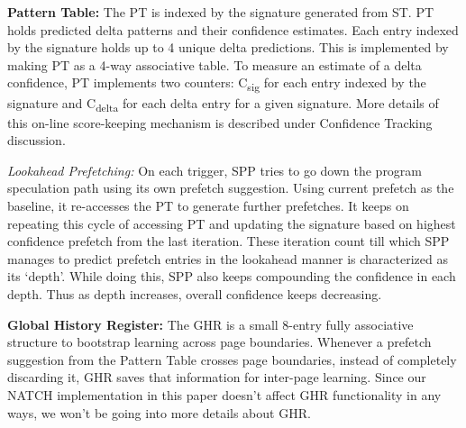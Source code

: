 \textbf{Pattern Table:} The PT is indexed by the signature generated
from ST.  PT holds predicted delta patterns and their confidence
estimates.  Each entry indexed by the signature holds up to 4 unique
delta predictions.  This is implemented by making PT as a 4-way
associative table.  To measure an estimate of a delta confidence, PT
implements two counters: C\textsubscript{sig} for each entry indexed
by the signature and C\textsubscript{delta} for each delta entry for a
given signature.  More details of this on-line score-keeping mechanism
is described under Confidence Tracking discussion.

\textit{Lookahead Prefetching:} On each trigger, SPP tries to go down
the program speculation path using its own prefetch suggestion.
Using current prefetch as the baseline, it re-accesses the PT to generate further
prefetches.  It keeps on repeating this cycle of accessing PT and
updating the signature based on highest confidence prefetch from the
last iteration.  These iteration count till which SPP manages to
predict prefetch entries in the lookahead manner is characterized as
its `depth'.  While doing this, SPP also keeps compounding the
confidence in each depth.  Thus as depth increases, overall confidence
keeps decreasing.  

\textbf{Global History Register:} The GHR is a small 8-entry fully
associative structure to bootstrap learning across page boundaries. 
Whenever a prefetch suggestion from the
Pattern Table crosses page boundaries, instead of completely
discarding it, GHR saves that information for inter-page learning.
Since our NATCH implementation in this paper doesn't affect GHR
functionality in any ways, we won't be going into more details about
GHR.


